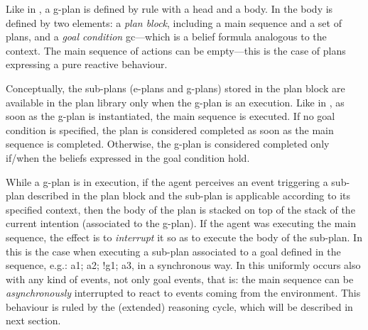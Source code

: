 Like in {\asl}, a g-plan is defined by rule with a head and a body.
%
In {\aser} the body is defined by two elements: 
%
a \emph{plan block}, including a main sequence and a set of plans, and a \emph{goal condition} \textsf{gc}---which is a belief formula analogous to the context. 
%
The main sequence of actions can be empty---this is the case of plans expressing a pure reactive behaviour.
%

%
Conceptually, the sub-plans (e-plans and g-plans) stored in the plan block are available in the plan library only when the g-plan is an execution.
%
Like in {\asl}, as soon as the g-plan is instantiated, the main sequence is executed.
%
If no goal condition is specified, the plan is considered completed as soon as the main sequence is completed.
%
Otherwise, the g-plan is considered completed only if/when the beliefs expressed in the goal condition hold. 
%

%
%
%


While a g-plan is in execution, if the agent perceives an event triggering a sub-plan described in the plan block and the sub-plan is applicable according to its specified context, then the body of the plan is stacked on top of the stack of the current intention (associated to the g-plan).
%
If the agent was executing the main sequence, the effect is to \emph{interrupt} it so as to execute the body of the sub-plan.
%
In {\asl} this is the case when executing a sub-plan associated to a goal defined in the sequence, e.g.: \textsf{a1; a2; !g1; a3}, in a synchronous way.
%
In {\aser} this uniformly occurs also with any kind of events, not only goal events, that is:
%
the main sequence can be \emph{asynchronously} interrupted to react to events coming from the environment.
%
This behaviour is ruled by the (extended) reasoning cycle, which will be described in next section.


